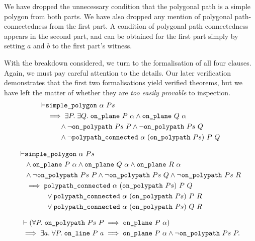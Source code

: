 We have dropped the unnecessary condition that the polygonal path is a simple polygon from both parts. We have also dropped any mention of polygonal path-connectedness from the first part. A condition of polygonal path connectedness appears in the second part, and can be obtained for the first part simply by setting $a$ and $b$ to the first part's witness.

With the breakdown considered, we turn to the formalisation of all four clauses. Again, we must pay careful attention to the details. Our later verification demonstrates that the first two formalisations yield verified theorems, but we have left the matter of whether they are \emph{too easily provable} to inspection.
\begin{equation}\label{eq:jordanFormal1}
  \begin{split}
\vdash &\code{simple\_polygon}\ \alpha\ Ps\\
       &\implies \exists P.\;\exists Q.\; \code{on\_plane}\ P\ \alpha \wedge \code{on\_plane}\ Q\ \alpha\\
       &\qquad\wedge \neg\code{on\_polypath}\ Ps\ P \wedge \neg\code{on\_polypath}\ Ps\ Q\\
       &\qquad\wedge \neg\code{polypath\_connected}\ \alpha\ (\code{on\_polypath}\ Ps)\ P\ Q
  \end{split}
\end{equation}

\begin{equation}\label{eq:jordanFormal2}
  \begin{split}
\vdash &\code{simple\_polygon}\ \alpha\ Ps\\
       &\wedge \code{on\_plane}\ P\ \alpha \wedge \code{on\_plane}\ Q\ \alpha \wedge \code{on\_plane}\ R\ \alpha\\
       &\wedge \neg\code{on\_polypath}\ Ps\ P\wedge \neg\code{on\_polypath}\ Ps\ Q\wedge \neg\code{on\_polypath}\ Ps\ R\\
       &\implies \code{polypath\_connected}\ \alpha\ (\code{on\_polypath}\ Ps)\ P\ Q\\
       &\qquad\quad\vee \code{polypath\_connected}\ \alpha\ (\code{on\_polypath}\ Ps)\ P\ R\\
       &\qquad\quad\vee \code{polypath\_connected}\ \alpha\ (\code{on\_polypath}\ Ps)\ Q\ R
     \end{split}
\end{equation}

\begin{equation}\label{eq:jordanFormal3}
  \begin{split}
    &\vdash
    (\forall P.\; \code{on\_polypath}\ Ps\ P \implies \code{on\_plane}\ P\ \alpha)
    \\&\implies\exists a.\; \forall P.\; \code{on\_line}\ P\ a \implies \code{on\_plane}\ P\ \alpha\wedge\neg\code{on\_polypath}\ Ps\ P.
    \end{split}
\end{equation}

